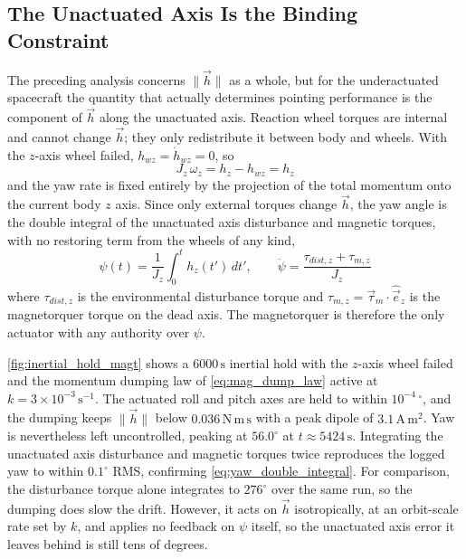 \subsection{The Unactuated Axis Is the Binding Constraint}
\label{subsec:dead_axis_constraint}
The preceding analysis concerns $\|\vec{h}\|$ as a whole, but for the underactuated spacecraft the quantity that actually determines pointing performance is the component of $\vec{h}$ along the unactuated axis. Reaction wheel torques are internal and cannot change $\vec{h}$; they only redistribute it between body and wheels. With the $z$-axis wheel failed, $h_{wz} = \dot{h}_{wz} = 0$, so
\begin{equation}
    J_z\,\omega_z = h_z - h_{wz} = h_z
    \label{eq:dead_axis_rate}
\end{equation}
and the yaw rate is fixed entirely by the projection of the total momentum onto the current body $z$ axis. Since only external torques change $\vec{h}$, the yaw angle is the double integral of the unactuated axis disturbance and magnetic torques, with no restoring term from the wheels of any kind,
\begin{equation}
    \psi(t) = \frac{1}{J_z}\int_0^t h_z(t')\,dt', \qquad \ddot{\psi} = \frac{\tau_{dist,z} + \tau_{m,z}}{J_z}
    \label{eq:yaw_double_integral}
\end{equation}
where $\tau_{dist,z}$ is the environmental disturbance torque and $\tau_{m,z} = \vec{\tau}_m\cdot\hat{\vec{e}}_z$ is the magnetorquer torque on the dead axis. The magnetorquer is therefore the only actuator with any authority over $\psi$.

\autoref{fig:inertial_hold_magt} shows a $6000\,\mathrm{s}$ inertial hold with the $z$-axis wheel failed and the momentum dumping law of \autoref{eq:mag_dump_law} active at $k = 3\times10^{-3}\,\mathrm{s^{-1}}$. The actuated roll and pitch axes are held to within $10^{-4}\,^\circ$, and the dumping keeps $\|\vec{h}\|$ below $0.036\,\mathrm{N\,m\,s}$ with a peak dipole of $3.1\,\mathrm{A\,m^2}$. Yaw is nevertheless left uncontrolled, peaking at $56.0^\circ$ at $t \approx 5424\,\mathrm{s}$. Integrating the unactuated axis disturbance and magnetic torques twice reproduces the logged yaw to within $0.1^\circ$ RMS, confirming \autoref{eq:yaw_double_integral}. For comparison, the disturbance torque alone integrates to $276^\circ$ over the same run, so the dumping does slow the drift. However, it acts on $\vec{h}$ isotropically, at an orbit-scale rate set by $k$, and applies no feedback on $\psi$ itself, so the unactuated axis error it leaves behind is still tens of degrees.

